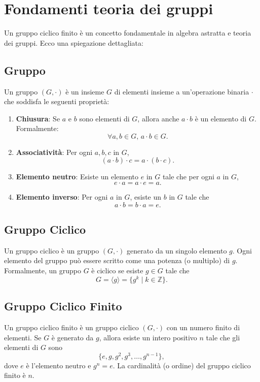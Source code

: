 \documentclass[a4paper,12pt]{report}
\begin{document}
\section{Fondamenti teoria dei gruppi}

Un gruppo ciclico finito è un concetto fondamentale in algebra astratta e teoria dei gruppi. Ecco una spiegazione dettagliata:

\subsection*{Gruppo}

Un gruppo \( (G, \cdot) \) è un insieme \( G \) di elementi insieme a un'operazione binaria \( \cdot \) che soddisfa le seguenti proprietà:

\begin{enumerate}
    \item \textbf{Chiusura}: Se \( a \) e \( b \) sono elementi di \( G \), allora anche \( a \cdot b \) è un elemento di \( G \). Formalmente:
    \[
    \forall a, b \in G, \, a \cdot b \in G.
    \]
    \item \textbf{Associatività}: Per ogni \( a, b, c \) in \( G \),
    \[
    (a \cdot b) \cdot c = a \cdot (b \cdot c).
    \]
    \item \textbf{Elemento neutro}: Esiste un elemento \( e \) in \( G \) tale che per ogni \( a \) in \( G \),
    \[
    e \cdot a = a \cdot e = a.
    \]
    \item \textbf{Elemento inverso}: Per ogni \( a \) in \( G \), esiste un \( b \) in \( G \) tale che
    \[
    a \cdot b = b \cdot a = e.
    \]
\end{enumerate}

\subsection*{Gruppo Ciclico}

Un gruppo ciclico è un gruppo \( (G, \cdot) \) generato da un singolo elemento \( g \). Ogni elemento del gruppo può essere scritto come una potenza (o multiplo) di \( g \). Formalmente, un gruppo \( G \) è ciclico se esiste \( g \in G \) tale che
\[G = \langle g \rangle = \{ g^k \mid k \in \mathbb{Z} \}.\]

\subsection*{Gruppo Ciclico Finito}

Un gruppo ciclico finito è un gruppo ciclico \( (G, \cdot) \) con un numero finito di elementi. Se \( G \) è generato da \( g \), allora esiste un intero positivo \( n \) tale che gli elementi di \( G \) sono
\[\{e, g, g^2, g^3, \ldots, g^{n-1}\},\]
dove \( e \) è l'elemento neutro e \( g^n = e \). La cardinalità (o ordine) del gruppo ciclico finito è \( n \).
\end{document}
